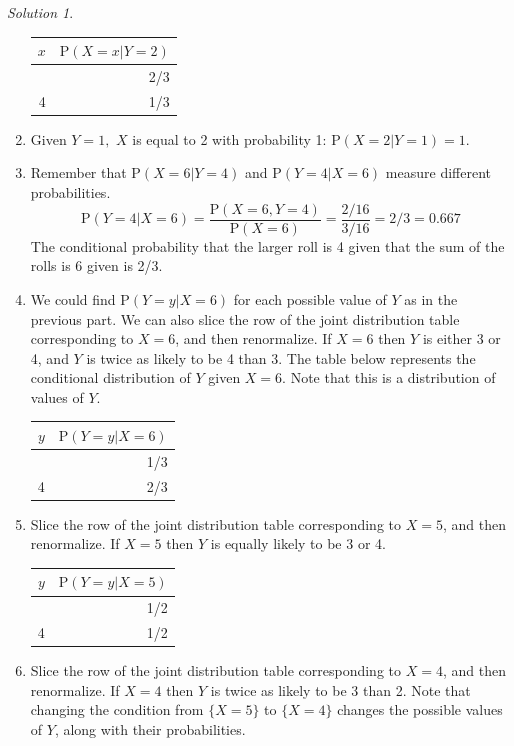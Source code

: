 \documentclass[
  letterpaper,
  DIV=11,
  numbers=noendperiod]{scrreprt}
\theoremstyle{plain}
\theoremstyle{definition}
\theoremstyle{definition}
\theoremstyle{definition}
\theoremstyle{remark}
\newtheorem{refsolution}{Solution}[chapter]
\begin{document}
\begin{tcolorbox}
\begin{refsolution}
\begin{enumerate}
  \begin{longtable}[]{@{}rr@{}}
  \toprule\noalign{}
  \(x\) & \(\textrm{P}(X = x | Y = 2)\) \\
  \midrule\noalign{}
  \endhead
  \bottomrule\noalign{}
  \endlastfoot
  3 & 2/3 \\
  4 & 1/3 \\
  \end{longtable}
\item
  Given \(Y=1,\) \(X\) is equal to 2 with probability 1:
  \(\textrm{P}(X = 2 | Y = 1)=1\).
\item
  Remember that \(\textrm{P}(X = 6 | Y = 4)\) and
  \(\textrm{P}(Y = 4 | X = 6)\) measure different probabilities. \[
  \textrm{P}(Y = 4 | X = 6) =\frac{\textrm{P}(X = 6, Y = 4)}{\textrm{P}(X=6)} = \frac{2/16}{3/16} = 2/3 =0.667
  \] The conditional probability that the larger roll is 4 given that
  the sum of the rolls is 6 given is 2/3.
\item
  We could find \(\textrm{P}(Y=y|X = 6)\) for each possible value of
  \(Y\) as in the previous part. We can also slice the row of the joint
  distribution table corresponding to \(X=6\), and then renormalize. If
  \(X = 6\) then \(Y\) is either 3 or 4, and \(Y\) is twice as likely to
  be 4 than 3. The table below represents the conditional distribution
  of \(Y\) given \(X = 6\). Note that this is a distribution of values
  of \(Y\).

  \begin{longtable}[]{@{}rr@{}}
  \toprule\noalign{}
  \(y\) & \(\textrm{P}(Y = y | X = 6)\) \\
  \midrule\noalign{}
  \endhead
  \bottomrule\noalign{}
  \endlastfoot
  3 & 1/3 \\
  4 & 2/3 \\
  \end{longtable}
\item
  Slice the row of the joint distribution table corresponding to
  \(X=5\), and then renormalize. If \(X=5\) then \(Y\) is equally likely
  to be 3 or 4.

  \begin{longtable}[]{@{}rr@{}}
  \toprule\noalign{}
  \(y\) & \(\textrm{P}(Y = y | X = 5)\) \\
  \midrule\noalign{}
  \endhead
  \bottomrule\noalign{}
  \endlastfoot
  3 & 1/2 \\
  4 & 1/2 \\
  \end{longtable}
\item
  Slice the row of the joint distribution table corresponding to
  \(X=4\), and then renormalize. If \(X=4\) then \(Y\) is twice as
  likely to be 3 than 2. Note that changing the condition from
  \(\{X=5\}\) to \(\{X=4\}\) changes the possible values of \(Y\), along
  with their probabilities.


\end{enumerate}
\end{refsolution}
\end{tcolorbox}
\end{document}
